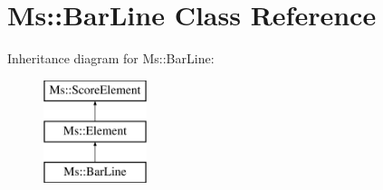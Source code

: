 \hypertarget{class_ms_1_1_bar_line}{}\section{Ms\+:\+:Bar\+Line Class Reference}
\label{class_ms_1_1_bar_line}
Inheritance diagram for Ms\+:\+:Bar\+Line\+:\begin{figure}[H]
\begin{center}
\leavevmode
\includegraphics[height=3.000000cm]{class_ms_1_1_bar_line}
\end{center}
\end{figure}
